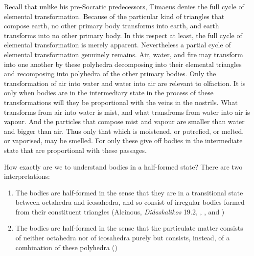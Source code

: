 Recall that unlike his pre-Socratic predecessors, Timaeus denies the full cycle of elemental transformation. Because of the particular kind of triangles that compose earth, no other primary body transforms into earth, and earth transforms into no other primary body. In this respect at least, the full cycle of elemental transformation is merely apparent. Nevertheless a partial cycle of elemental transformation genuinely remains. Air, water, and fire may transform into one another by these polyhedra decomposing into their elemental triangles and recomposing into polyhedra of the other primary bodies. Only the transformation of air into water and water into air are relevant to olfaction. It is only when bodies are in the intermediary state in the process of these transformations will they be proportional with the veins in the nostrils. What transforms from air into water is mist, and what transfroms from water into air is vapour. And the particles that compose mist and vapour are smaller than water and bigger than air. Thus only that which is moistened, or putrefied, or melted, or vaporised, may be smelled. For only these give off bodies in the intermediate state that are proportional with these passages.

How exactly are we to understand bodies in a half-formed state? There are two interpretations:
\begin{enumerate}
	\item The bodies are half-formed in the sense that they are in a transitional state between octahedra and icosahedra, and so consist of irregular bodies formed from their constituent triangles (Alcinous, \emph{Didaskalikos} 19.2, \citealt[275 n8]{Archer-Hind:1888qd}, \citealt[471]{Taylor:1928qb}, and \citealt[274]{Cornford:1935fk})
	\item The bodies are half-formed in the sense that the particulate matter consists of neither octahedra nor of icosahedra purely but consists, instead, of a combination of these polyhedra (\citealt{Vlastos:1967jw})
\end{enumerate}

